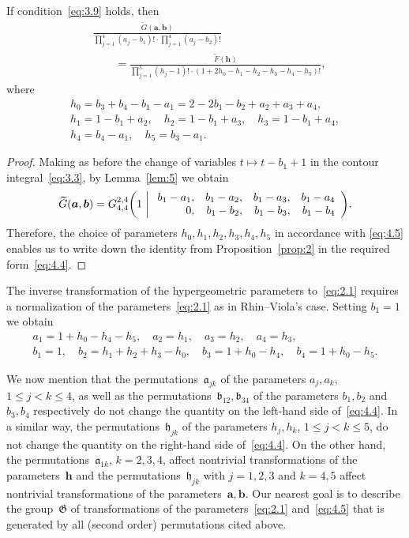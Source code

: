 \documentclass[a4paper,twoside]{article}
\numberwithin{equation}{section}
\renewcommand{\[}{\lfloor}
\renewcommand{\]}{\rfloor}
\newcommand{\<}{\langle}
\renewcommand{\>}{\rangle}
\newcommand{\wt}{\widetilde}
\newcommand{\ba}{\boldsymbol a}
\newcommand{\bb}{\boldsymbol b}
\newcommand{\bh}{\boldsymbol h}
\newcommand{\fa}{\mathfrak a}
\newcommand{\fb}{\mathfrak b}
\newcommand{\fh}{\mathfrak h}
\newcommand{\fG}{\mathfrak G}
\begin{document}
\begin{lemma}
\label{lem:7}
If condition~\eqref{eq:3.9} holds, then
\begin{align}
&
\frac{\wt G(\ba,\bb)}
{\prod_{j=1}^4(a_j-b_1)!\cdot\prod_{j=1}^4(a_j-b_2)!}
\nonumber\\ &\qquad
=\frac{\wt F(\bh)}
{\prod_{j=1}^5(h_j-1)!\cdot(1+2h_0-h_1-h_2-h_3-h_4-h_5)!},
\label{eq:4.4}
\end{align}
where
\begin{equation}
\begin{gathered}
h_0=b_3+b_4-b_1-a_1=2-2b_1-b_2+a_2+a_3+a_4,
\\
h_1=1-b_1+a_2, \quad h_2=1-b_1+a_3, \quad h_3=1-b_1+a_4,
\\
h_4=b_4-a_1, \quad h_5=b_3-a_1.
\end{gathered}
\label{eq:4.5}
\end{equation}
\end{lemma}

\begin{proof}
Making as before the change of variables $t\mapsto t-b_1+1$ in the contour
integral~\eqref{eq:3.3}, by Lemma~\ref{lem:5} we obtain
$$
\wt G(\ba,\bb)
=G_{4,4}^{2,4}\biggl(1\biggm|\begin{array}{rrrr}
b_1-a_1, & b_1-a_2, & b_1-a_3, & b_1-a_4 \\
      0, & b_1-b_2, & b_1-b_3, & b_1-b_4
\end{array}\biggr).
$$
Therefore, the choice of parameters $h_0,h_1,h_2,h_3,h_4,h_5$ in accordance
with \eqref{eq:4.5} enables us to write down the identity from
Proposition~\ref{prop:2} in the required form~\eqref{eq:4.4}.
\end{proof}

The inverse transformation of the hypergeometric parameters
to~\eqref{eq:2.1} requires a normalization of the parameters~\eqref{eq:2.1}
as in Rhin--Viola's case. Setting $b_1=1$ we obtain
\begin{equation}
\begin{gathered}
a_1=1+h_0-h_4-h_5, \quad
a_2=h_1, \quad a_3=h_2, \quad a_4=h_3,
\\
b_1=1, \quad
b_2=h_1+h_2+h_3-h_0, \quad b_3=1+h_0-h_4, \quad b_4=1+h_0-h_5.
\end{gathered}
\label{eq:4.6}
\end{equation}

We now mention that the permutations~$\fa_{jk}$ of the parameters $a_j,a_k$,
$1\le j<k\le4$, as well as the permutations~$\fb_{12},\fb_{34}$
of the parameters $b_1,b_2$ and $b_3,b_4$ respectively
do not change the quantity on the left-hand side of~\eqref{eq:4.4}.
In a similar way, the permutations~$\fh_{jk}$ of the parameters
$h_j,h_k$, $1\le j<k\le5$, do not change the quantity
on the right-hand side of~\eqref{eq:4.4}. On the other hand,
the permutations~$\fa_{1k}$, $k=2,3,4$, affect nontrivial
transformations of the parameters~$\bh$ and the permutations~$\fh_{jk}$
with $j=1,2,3$ and $k=4,5$ affect nontrivial
transformations of the parameters~$\ba,\bb$. Our nearest goal
is to describe the group~$\fG$ of transformations
of the parameters~\eqref{eq:2.1} and~\eqref{eq:4.5} that is generated
by all (second order) permutations cited above.
\end{document}
